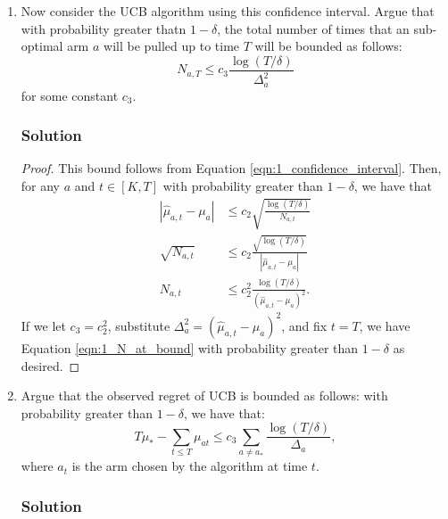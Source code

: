 \begin{enumerate}
\item Now consider the UCB algorithm using this confidence interval. Argue that
  with probability greater thatn $1 - \delta$, the total number of times that an
  sub-optimal arm $a$ will be pulled up to time $T$ will be bounded as follows:
  \begin{equation}
    N_{a,T} \leq c_3 \frac{\log\left(T/\delta\right)}{\Delta_a^2}
    \label{eqn:1_N_at_bound}
  \end{equation}
  for some constant $c_3$.

  \subsubsection*{Solution}

  \begin{proof}
    This bound follows from Equation \ref{eqn:1_confidence_interval}. Then, for
    any $a$ and $t \in [K, T]$ with probability greater than $1 - \delta$, we
    have that
    \begin{align*}
      \left\lvert \hat{\mu}_{a,t} - \mu_a \right\rvert
      &\leq  c_2 \sqrt{\frac{\log\left(T/\delta\right)}{N_{a,t}}} \\
      \sqrt{N_{a,t}}
      &\leq c_2\frac{
        \sqrt{\log\left(T/\delta\right)}
        }{\left\lvert \hat{\mu}_{a,t} - \mu_a \right\rvert} \\
      N_{a,t}
      &\leq c_2^2 \frac{\log\left(T/\delta\right)}{
        \left(\hat{\mu}_{a,t} - \mu_a \right)^2}.
    \end{align*}
    If we let $c_3 = c_2^2$, substitute
    $\Delta_a^2 = \left(\hat{\mu}_{a,t} - \mu_a \right)^2$, and fix $t = T$, we
    have Equation \ref{eqn:1_N_at_bound} with probability greater than
    $1 - \delta$ as desired.
  \end{proof}
\item Argue that the observed regret of UCB is bounded as follows: with
  probability greater than $1 - \delta$, we have that:
  \begin{equation}
    T\mu_* - \sum_{t \leq T} \mu_{at} \leq c_3 \sum_{a \neq a_*}\frac{\log\left(T/\delta\right)}{\Delta_a},
    \label{eqn:1_2_result}
  \end{equation}
  where $a_t$ is the arm chosen by the algorithm at time $t$.

  \subsubsection*{Solution}


\end{enumerate}
